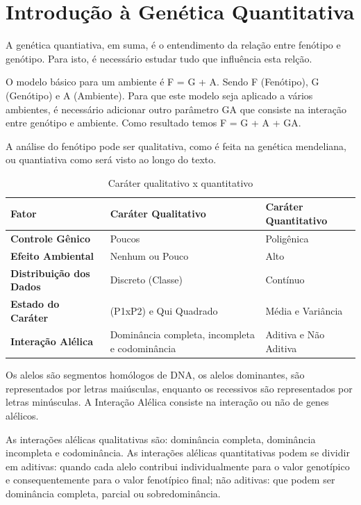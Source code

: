 

\chapter{Introdução à Genética Quantitativa}

A genética quantiativa, em suma, é o entendimento da relação entre fenótipo e genótipo. Para isto, é necessário estudar tudo que influência esta relção.

O modelo básico para um ambiente é F = G + A. Sendo F (Fenótipo), G (Genótipo) e A (Ambiente). Para que este modelo seja aplicado a vários ambientes, é necessário adicionar outro parâmetro GA que consiste na interação entre genótipo e ambiente. Como resultado temos F = G + A + GA.

A análise do fenótipo pode ser qualitativa, como é feita na genética mendeliana, ou quantiativa como será visto ao longo do texto.


\begin{table}[h]
\centering
\begin{tabular}{l l l}
\toprule
 Fator & \textbf{Caráter Qualitativo} & \textbf{Caráter Quantitativo}\\
\midrule
 \textbf{Controle Gênico} & Poucos & Poligênica \\
\textbf{Efeito Ambiental} & Nenhum ou Pouco & Alto \\
\textbf{Distribuição dos Dados} & Discreto (Classe) & Contínuo \\
\textbf{Estado do Caráter} & (P1xP2) e Qui Quadrado & Média e Variância \\
\textbf{Interação Alélica} & Dominância completa, incompleta e codominância &  Aditiva e Não Aditiva \\
\bottomrule
\end{tabular}
\caption{Caráter qualitativo x quantitativo} \label{tab:t01}
\end{table}


Os alelos são segmentos homólogos de DNA, os alelos dominantes, são representados por letras maiúsculas, enquanto os recessivos são representados por letras minúsculas. A Interação Alélica consiste na interação ou não de genes alélicos. 

As interações alélicas qualitativas são: dominância completa, dominância incompleta e codominância. As interações alélicas quantitativas podem se dividir em aditivas: quando cada alelo contribui individualmente para o valor genotípico e consequentemente para o valor fenotípico final; não aditivas: que podem ser dominância completa, parcial ou sobredominância.

